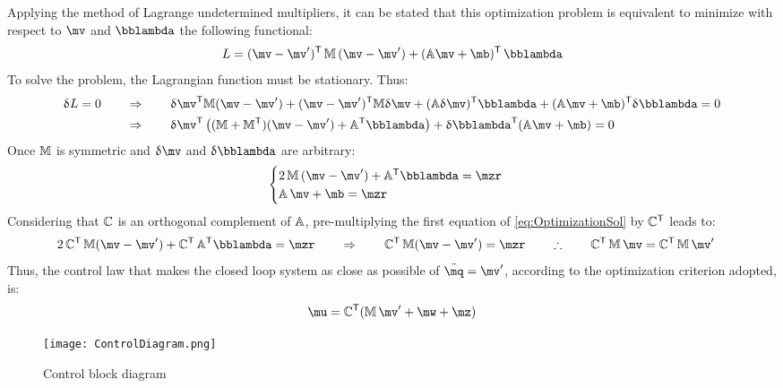 Applying the method of Lagrange undetermined multipliers, it can be stated that this
optimization problem is equivalent to minimize with respect to $\mv$ and $\mlambda$
the following functional:
\begin{equation}
L = (\mv - \mv')^\msT \, \mM \, (\mv - \mv') + (\mA \mv + \mb)^\msT \, \mlambda 
\end{equation}
To solve the problem, the Lagrangian function must be stationary. Thus:
\begin{align}
 	\dl L = 0 \qquad &\Rightarrow \qquad  
 	\dl \mv^\msT \mM (\mv - \mv') + (\mv - \mv')^\msT \mM \dl \mv + (\mA \dl \mv)^\msT \mlambda 
		+ (\mA \mv + \mb)^\msT \dl \mlambda = 0 
	\nonumber \\	
& 	\Rightarrow \qquad
	\dl \mv^\msT \left( (\mM + \mM^\msT)(\mv - \mv') + \mA^\msT \mlambda \right) + \dl \mlambda^\msT (\mA \mv + \mb) = 0 
\end{align}
Once $\mathbb{M}$ is symmetric and $\dl \mv$ and $\dl \mlambda$ are arbitrary:
\begin{equation} \label{eq:OptimizationSol}
\begin{cases}
2 \, \mM \, (\mv - \mv') + \mA^\msT \mlambda = \mzr \\
\mA \, \mv + \mb = \mzr
\end{cases}
\end{equation}
Considering that $\mathbb{C}$ is an orthogonal complement of $\mathbb{A}$, pre-multiplying the first equation of 
\eqref{eq:OptimizationSol} by $\mathbb{C}^{\mathsf{T}}$ leads to:
\begin{align}
& 	2 \, \mC^\msT \, \mM (\mv - \mv') + \mC^\msT \, \mA^\msT \mlambda = \mzr 
	\qquad 	\Rightarrow \qquad \mC^\msT \, \mM (\mv - \mv')  = \mzr 
	\qquad \therefore \qquad \mC^\msT \, \mM \, \mv  = \mC^\msT \, \mM \, \mv'
	\label{eq:OptimizationSol2}
\end{align}
Thus, the control law that makes the closed loop system as close as possible of $\ddot{\mq} = \mv'$, 
according to the optimization criterion adopted, is:
\begin{equation} \label{eq:ControlLawFinal}
\mu = \mC^\msT ( \mM \, \mv' + \mw + \mz )
\end{equation}

\begin{figure}[H]
	\centering
	\texttt{[image: ControlDiagram.png]}
	\caption{Control block diagram}
	\label{ControlDiagram}
\end{figure}

